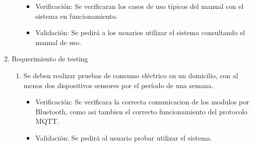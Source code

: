 \documentclass[
11pt, %
]{charter}
\begin{document}
\begin{enumerate}
\begin{enumerate}
		\begin{itemize}
		\item Verificación: Se verificaran los casos de uso típicos del manual con el sistema en funcionamiento.
		\item Validación: Se pedirá a los usuarios utilizar el sistema consultando el manual de uso.
		\end{itemize}
		
		\end{enumerate}
		
		
		
	
			
	\item Requerimiento de testing
		\begin{enumerate}
		\item Se deben realizar pruebas de consumo eléctrico en un domicilio, con al menos dos dispositivos sensores por el período de una semana.
			\begin{itemize}
			\item Verificación: Se verificara la correcta comunicacion de los modulos por Bluetooth, como asi tambien el correcto funcionamiento del protocolo MQTT.
			\item Validación: Se pedirá al usuario probar utilizar el sistema.
			\end{itemize}
			

\end{enumerate}
\end{enumerate}
\end{document}
